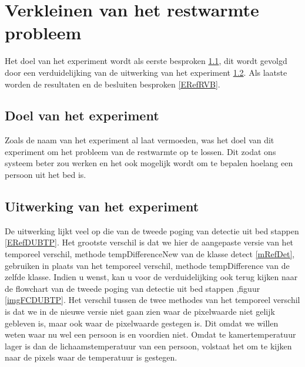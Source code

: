  \section{Verkleinen van het restwarmte probleem}
 \label{ERefRWV}
 Het doel van het experiment wordt als eerste besproken \ref{ERefRVD}, dit wordt gevolgd door een verduidelijking van de uitwerking van het experiment \ref{ERefRVV}. Als laatste worden de resultaten en de besluiten besproken \ref{ERefRVB}.
 
 \subsection {Doel van het experiment}
 \label{ERefRVD}
 Zoals de naam van het experiment al laat vermoeden, was het doel van dit experiment om het probleem van de restwarmte op te lossen. Dit zodat ons systeem beter zou werken en het ook mogelijk wordt om te bepalen hoelang een persoon uit het bed is. 
 
 \subsection{Uitwerking van het experiment}
 \label{ERefRVV}
 De uitwerking lijkt veel op die van de tweede poging van detectie uit bed stappen \ref{ERefDUBTP}. Het grootste verschil is dat we hier de aangepaste versie van het temporeel verschil, methode tempDifferenceNew van de klasse detect \ref{mRefDet}, gebruiken in plaats van het temporeel verschil, methode tempDifference van de zelfde klasse. Indien u wenst, kan u voor de verduidelijking ook terug kijken naar de flowchart van de tweede poging van detectie uit bed stappen ,figuur \ref{imgFCDUBTP}. Het verschil tussen de twee methodes van het temporeel verschil is dat we in de nieuwe versie niet gaan zien waar de pixelwaarde niet gelijk gebleven is, maar ook waar de pixelwaarde gestegen is. Dit omdat we willen weten waar nu wel een persoon is en voordien niet. Omdat te kamertemperatuur lager is dan de lichaamstemperatuur van een persoon, volstaat het om te kijken naar de pixels waar de temperatuur is gestegen. 
 
 
